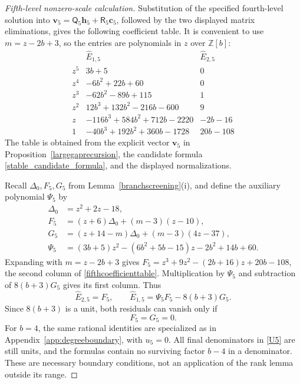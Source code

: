 \documentclass[12pt]{article}
\theoremstyle{remark}
\begin{document}
\begin{proof}[Fifth-level nonzero-scale calculation]
Substitution of the specified fourth-level solution into
$\mathbf v_5=\mathsf Q_5\mathbf h_5+\mathsf R_5\mathbf c_5$,
followed by the two displayed matrix eliminations, gives the following
coefficient table.  It is convenient
to use $m=z-2b+3$, so the entries are polynomials in $z$ over
$\mathbb Z[b]$:
\begin{equation}\label{fifthcoefficienttable}
\begin{array}{c|l|l}
 &\widehat E_{1,5}&\widehat E_{2,5}\\ \hline
 z^5&3b+5&0\\
 z^4&-6b^2+22b+60&0\\
 z^3&-62b^2-89b+115&1\\
 z^2&12b^3+132b^2-216b-600&9\\
 z&-116b^3+584b^2+712b-2220&-2b-16\\
 1&-40b^3+192b^2+360b-1728&20b-108
\end{array}
\end{equation}
The table is obtained from the explicit vector $\mathbf v_5$ in
Proposition~\ref{largegaprecursion}, the candidate formula
\eqref{stable_candidate_formula}, and the displayed normalizations.

Recall $\Delta_0,F_5,G_5$ from
Lemma~\ref{branchscreening}(i), and define the auxiliary
polynomial $\Psi_5$ by
\begin{equation}\label{FGstruct}
\begin{aligned}
 \Delta_0&=z^2+2z-18,\\
 F_5&=(z+6)\Delta_0+(m-3)(z-10),\\
 G_5&=(z+14-m)\Delta_0+(m-3)(4z-37),\\
 \Psi_5&=(3b+5)z^2-(6b^2+5b-15)z-2b^2+14b+60.
\end{aligned}
\end{equation}
Expanding with $m=z-2b+3$ gives
$F_5=z^3+9z^2-(2b+16)z+20b-108$, the second column of
\eqref{fifthcoefficienttable}.  Multiplication by $\Psi_5$ and subtraction
of $8(b+3)G_5$ gives its first column.  Thus
\[
 \widehat E_{2,5}=F_5,\qquad \widehat E_{1,5}=\Psi_5F_5-8(b+3)G_5.
\]
Since $8(b+3)$ is a unit, both residuals can vanish only if
\begin{equation}\label{vfifthres}
 F_5=G_5=0.
\end{equation}
For $b=4$, the same rational identities are specialized as in
Appendix~\ref{app:degreeboundary}, with $u_5=0$.  All final denominators in
\eqref{U5} are still units, and the formulas contain no surviving factor
$b-4$ in a denominator.  These are necessary boundary conditions, not
an application of the rank lemma outside its range.


\end{proof}
\end{document}
